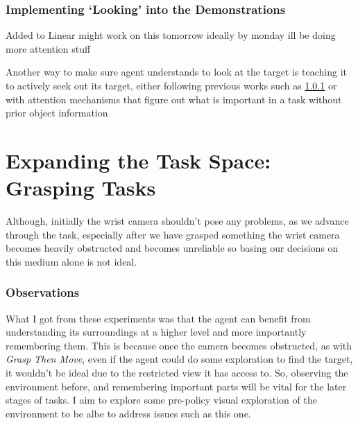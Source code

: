 \subsubsection{Implementing `Looking' into the Demonstrations}\label{ew-looking-at-target}
Added to Linear might work on this tomorrow ideally by monday ill be doing more attention stuff

Another way to make sure agent understands to look at the target is teaching it to actively seek out its target, either following previous works such as \ref{} or with attention mechanisms that figure out what is important in a task without prior object information 

\section{Expanding the Task Space: Grasping Tasks}


Although, initially the wrist camera shouldn't pose any problems, as we advance through the task, especially after we have grasped something the wrist camera becomes heavily obstructed and becomes unreliable so basing our decisions on this medium alone is not ideal.

\subsubsection{Observations}
What I got from these experiments was that the agent can benefit from understanding its surroundings at a higher level and more importantly remembering them. This is because once the camera becomes obstructed, as with \emph{Grasp Then Move}, even if the agent could do some exploration to find the target, it wouldn't be ideal due to the restricted view it has access to. So, observing the environment before, and remembering important parts will be vital for the later stages of tasks. I aim to explore some pre-policy visual exploration of the environment to be albe to address issues such as this one.
